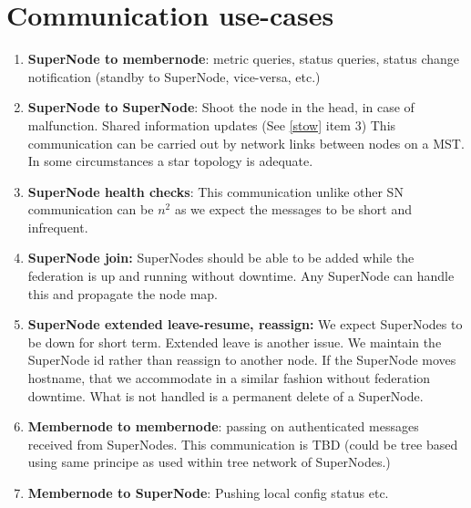 \documentclass[oneside,12pt]{memoir}
\begin{document}
\section{Communication use-cases}
\label{commcases}



\begin{enumerate}
\item \textbf{SuperNode to membernode}: metric queries, status queries, status change notification (standby to SuperNode, vice-versa, etc.)
\item \textbf{SuperNode to SuperNode}: Shoot the node in the head, in case of malfunction.  Shared information updates (See \ref{stow} item 3)  This communication can be carried out by network links between nodes on a MST.   In some circumstances a star topology is adequate.  
\item \textbf{SuperNode health checks}:  This communication unlike other SN communication can be $n^2$ as we expect the messages to be short and infrequent.   
\item \textbf{SuperNode join:}  SuperNodes should be able to be added while the federation is up and running without downtime.  Any SuperNode can handle this and propagate the node map.

\item \textbf{SuperNode extended leave-resume, reassign:}  We expect SuperNodes to be down for short term.  Extended leave is another issue. We maintain the SuperNode id rather than reassign to another node.  If the SuperNode moves hostname, that we accommodate in a similar fashion without federation downtime.  What is not handled is a permanent delete of a SuperNode.  


\item \textbf{Membernode to membernode}: passing on authenticated messages received from SuperNodes.  This communication is TBD (could be tree based using same principe as used within tree network of SuperNodes.) %
\item \textbf{Membernode to SuperNode}: Pushing local config status etc.
\end{enumerate}
\end{document}
